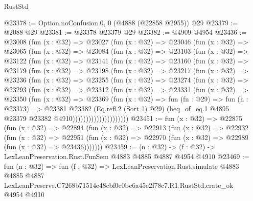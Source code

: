 \begin{lexlean}{RustStd}
\begin{coremodule}
@23378 := Option.noConfusion.{0, 0} (@4888 (@22858 @2955)) @29
@23379 := @2088 @29
@23381 := @23378 @23379 @29
@23382 := @4909 @4954
@23436 := @23008
    (fun (x : @32) =>
    @23027
      (fun (x : @32) =>
      @23046
        (fun (x : @32) =>
        @23065
          (fun (x : @32) =>
          @23084
            (fun (x : @32) =>
            @23103
              (fun (x : @32) =>
              @23122
                (fun (x : @32) =>
                @23141
                  (fun (x : @32) =>
                  @23160
                    (fun (x : @32) =>
                    @23179
                      (fun (x : @32) =>
                      @23198
                        (fun (x : @32) =>
                        @23217
                          (fun (x : @32) =>
                          @23236
                            (fun (x : @32) =>
                            @23255
                              (fun (x : @32) =>
                              @23274
                                (fun (x : @32) =>
                                @23293
                                  (fun (x : @32) =>
                                  @23312
                                    (fun (x : @32) =>
                                    @23331
                                      (fun (x : @32) =>
                                      @23350
                                        (fun (x : @32) =>
                                        @23369
                                          (fun (x : @32) =>
                                          fun (fn : @29) =>
                                          fun (h : @23373) =>
                                          @23381
                                            @23382
                                            (Eq.refl.{2} (Sort 1) @29)
                                            (heq_of_eq.{1}
                                              @4895
                                              @23379
                                              @23382
                                              @4910)))))))))))))))))))))
@23451 := fun (x : @32) =>
  @22875
    (fun (x : @32) =>
    @22894
      (fun (x : @32) =>
      @22913
        (fun (x : @32) =>
        @22932
          (fun (x : @32) =>
          @22951 (fun (x : @32) => @22970 (fun (x : @32) => @22989 (fun (x : @32) => @23436)))))))
@23459 := (n : @32) -> (f : @32) -> LexLeanPreservation.Rust.FunSem @4883 @4885 @4887 @4954 @4910
@23469 := fun (n : @32) =>
  fun (f : @32) =>
  LexLeanPreservation.Rust.simulate
    @4883
    @4885
    @4887
    LexLeanPreserve.C7268b71514e48cbf0c0bc6a45e2f78c7.R1.RustStd.crate_ok
    @4954
    @4910
\end{coremodule}
\end{lexlean}
